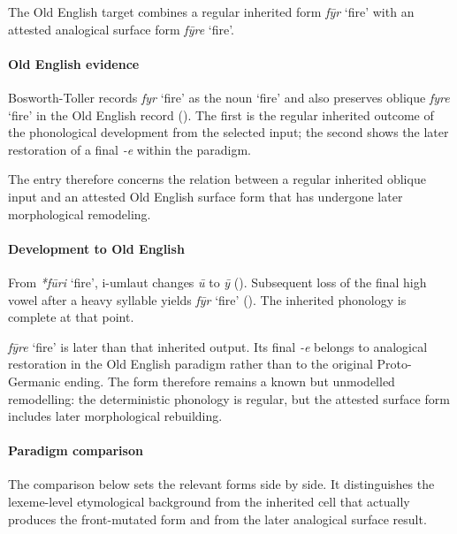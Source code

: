 \documentclass[
  british,
  a4paper,
]{article}
\providecommand{\Recon}[1]{\emph{*#1}}
\begin{document}
The Old English target combines a regular inherited form {\emph{fȳr}}
`fire' with an attested analogical surface form {\emph{fȳre}} `fire'.

\paragraph{Old English evidence}\label{old-english-evidence-147}

Bosworth-Toller records {\emph{fyr}} `fire' as the noun `fire' and also
preserves oblique {\emph{fyre}} `fire' in the Old English record
(). The
first is the regular inherited outcome of the phonological development
from the selected input; the second shows the later restoration of a
final \emph{-e} within the paradigm.

The entry therefore concerns the relation between a regular inherited
oblique input and an attested Old English surface form that has
undergone later morphological remodeling.

\paragraph{Development to Old
English}\label{development-to-old-english-147}

From \Recon{fūri} `fire', i-umlaut changes \emph{ū} to \emph{ȳ}
().
Subsequent loss of the final high vowel after a heavy syllable yields
{\emph{fȳr}} `fire' (). The inherited phonology is complete at that point.

{\emph{fȳre}} `fire' is later than that inherited output. Its final
\emph{-e} belongs to analogical restoration in the Old English paradigm
rather than to the original Proto-Germanic ending. The form therefore
remains a known but unmodelled remodelling: the deterministic phonology
is regular, but the attested surface form includes later morphological
rebuilding.

\paragraph{Paradigm comparison}\label{paradigm-comparison-27}

The comparison below sets the relevant forms side by side. It
distinguishes the lexeme-level etymological background from the
inherited cell that actually produces the front-mutated form and from
the later analogical surface result.
\end{document}
